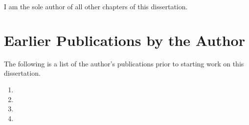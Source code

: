 I am the sole author of all other chapters of this dissertation.

\section{Earlier Publications by the Author}

The following is a list of the author's publications prior to starting
work on this dissertation.

\begin{enumerate}
    \item{}
    \item{}
    \item{}
    \item{}
\end{enumerate}

